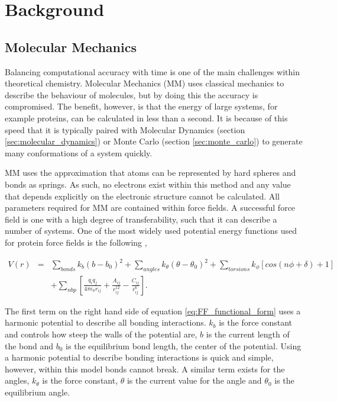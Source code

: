 \chapter{Background} \label{Chapter:background}

\section{Molecular Mechanics}

Balancing computational accuracy with time is one of the main challenges within theoretical chemistry.  Molecular Mechanics (MM) uses classical mechanics to describe the behaviour of molecules, but by doing this the accuracy is compromised.  The benefit, however, is that the energy of large systems, for example proteins, can be calculated in less than a second.  It is because of this speed that it is typically paired with Molecular Dynamics (section \ref{sec:molecular_dynamics}) or Monte Carlo (section \ref{sec:monte_carlo}) to generate many conformations of a system quickly.

MM uses the approximation that atoms can be represented by hard spheres and bonds as springs.  As such, no electrons exist within this method and any value that depends explicitly on the electronic structure cannot be calculated.  All parameters required for MM are contained within force fields.  A successful force field is one with a high degree of transferability, such that it can describe a number of systems.  One of the most widely used potential energy functions used for protein force fields is the following \cite{Case_MM_intro},

\begin{eqnarray}
 V(r) &=& \sum_{bonds} k_b(b-b_0)^2+\sum_{angles}k_{\theta}(\theta-\theta_0)^2+\sum_{torsions}k_{\phi}[cos(n\phi+\delta)+1] \nonumber \\ \label{eq:FF_functional_form}
 \ & & +\sum_{nbp}\left[\frac{q_iq_j}{4\pi \epsilon_0 r_{ij}}+\frac{A_{ij}}{r_{ij}^{12}}-\frac{C_{ij}}{r_{ij}^6}\right] .
\end{eqnarray}

The first term on the right hand side of equation \ref{eq:FF_functional_form} uses a harmonic potential to describe all bonding interactions.  $k_b$ is the force constant and controls how steep the walls of the potential are, $b$ is the current length of the bond and $b_0$ is the equilibrium bond length, the center of the potential.  Using a harmonic potential to describe bonding interactions is quick and simple, however, within this model bonds cannot break.  A similar term exists for the angles, $k_\theta$ is the force constant, $\theta$ is the current value for the angle and $\theta_0$ is the equilibrium angle.

